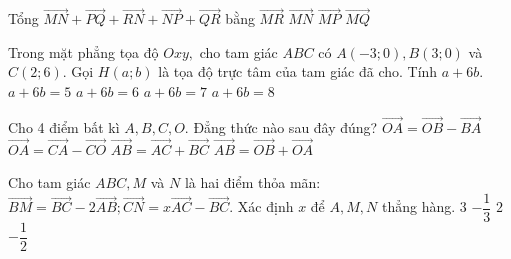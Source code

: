 \begin{ex}%
	Tổng $\overrightarrow{MN}+\overrightarrow{PQ}+\overrightarrow{RN}+\overrightarrow{NP}+\overrightarrow{QR}$ bằng
	\choice
	{$\overrightarrow{MR}$}
	{\True $\overrightarrow{MN}$}
	{$\overrightarrow{MP}$}
	{$\overrightarrow{MQ}$}
\end{ex}
\begin{ex}%
	Trong mặt phẳng tọa độ $Oxy,$ cho tam giác $ABC$ có $A\left(-3;0\right), B\left(3;0\right)$ và $C\left(2;6\right).$ Gọi $H\left(a;b\right)$ là tọa độ trực tâm của tam giác đã cho. Tính $a+6b.$
	\choice
	{$a+6b=5$}
	{$a+6b=6$}
	{\True $a+6b=7$}
	{$a+6b=8$}
\end{ex}
\begin{ex}%
	Cho 4 điểm bất kì $A,B,C,O$. Đẳng thức nào sau đây đúng?
	\choice
	{$\overrightarrow{OA}=\overrightarrow{OB}-\overrightarrow{BA}$}
	{\True $\overrightarrow{OA}=\overrightarrow{CA}-\overrightarrow{CO}$}
	{$\overrightarrow{AB}=\overrightarrow{AC}+\overrightarrow{BC}$}
	{$\overrightarrow{AB}=\overrightarrow{OB}+\overrightarrow{OA}$}
\end{ex}
\begin{ex}%
	Cho tam giác $ABC, M$ và $N$ là hai điểm thỏa mãn: $\overrightarrow{BM}=\overrightarrow{BC}-2\overrightarrow{AB};\overrightarrow{CN}=x\overrightarrow{AC}-\overrightarrow{BC}.$ Xác định $x$ để $A, M, N$ thẳng hàng.
	\choice
	{$3$}
	{$-\dfrac{1}{3}$}
	{$2$}
	{\True $-\dfrac{1}{2}$}
\end{ex}

